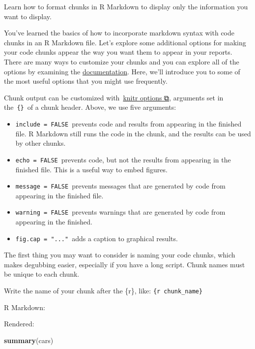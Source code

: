 \documentclass[
]{book}
\newenvironment{Shaded}{\begin{snugshade}}{\end{snugshade}}
\newcommand{\KeywordTok}[1]{\textcolor[rgb]{0.13,0.29,0.53}{\textbf{#1}}}
\newcommand{\NormalTok}[1]{#1}
\providecommand{\tightlist}{%
  \setlength{\itemsep}{0pt}\setlength{\parskip}{0pt}}
\begin{document}
Learn how to format chunks in R Markdown to display only the information you want to display.

You've learned the basics of how to incorporate markdown syntax with code chunks in an R Markdown file. Let's explore some additional options for making your code chunks appear the way you want them to appear in your reports. There are many ways to customize your chunks and you can explore all of the options by examining the \href{http://yihui.name/knitr/options/\#chunk_options}{documentation}. Here, we'll introduce you to some of the most useful options that you might use frequently.

Chunk output can be customized with~\href{http://yihui.name/knitr/options/}{knitr options ⧉}, arguments set in the~\texttt{\{\}}~of a chunk header. Above, we use five arguments:

\begin{itemize}
\tightlist
\item
  \texttt{include\ =\ FALSE}~prevents code and results from appearing in the finished file. R Markdown still runs the code in the chunk, and the results can be used by other chunks.
\item
  \texttt{echo\ =\ FALSE}~prevents code, but not the results from appearing in the finished file. This is a useful way to embed figures.
\item
  \texttt{message\ =\ FALSE}~prevents messages that are generated by code from appearing in the finished file.
\item
  \texttt{warning\ =\ FALSE}~prevents warnings that are generated by code from appearing in the finished.
\item
  \texttt{fig.cap\ =\ "..."}~adds a caption to graphical results.
\end{itemize}

The first thing you may want to consider is naming your code chunks, which makes degubbing easier, especially if you have a long script. Chunk names must be unique to each chunk.

Write the name of your chunk after the \{r\}, like: \texttt{\{r\ chunk\_name\}}

R Markdown:

Rendered:

\begin{Shaded}
\begin{Highlighting}[]
\KeywordTok{summary}\NormalTok{(cars)}
\end{Highlighting}
\end{Shaded}
\end{document}
